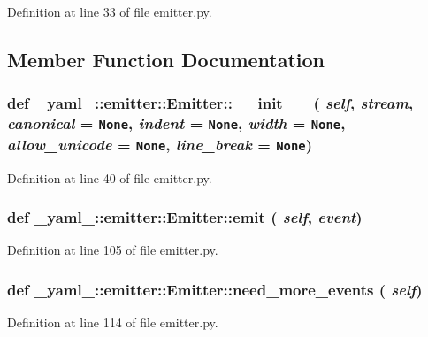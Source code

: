 Definition at line 33 of file emitter.py.

\subsection{Member Function Documentation}
\subsubsection{\setlength{\rightskip}{0pt plus 5cm}def \_\-yaml\_\-::emitter::Emitter::\_\-\_\-init\_\-\_\- ( {\em self},  {\em stream},  {\em canonical} = {\tt None},  {\em indent} = {\tt None},  {\em width} = {\tt None},  {\em allow\_\-unicode} = {\tt None},  {\em line\_\-break} = {\tt None})}\label{class__yaml___1_1emitter_1_1Emitter_31cc284eda38b8436d2d449ae2f1ad95}




Definition at line 40 of file emitter.py.
\subsubsection{\setlength{\rightskip}{0pt plus 5cm}def \_\-yaml\_\-::emitter::Emitter::emit ( {\em self},  {\em event})}\label{class__yaml___1_1emitter_1_1Emitter_9e17d668b7118f4464f56de2b6a8c16f}




Definition at line 105 of file emitter.py.
\subsubsection{\setlength{\rightskip}{0pt plus 5cm}def \_\-yaml\_\-::emitter::Emitter::need\_\-more\_\-events ( {\em self})}\label{class__yaml___1_1emitter_1_1Emitter_f3d1e6aba276855731d245c71ddbfa69}




Definition at line 114 of file emitter.py.

